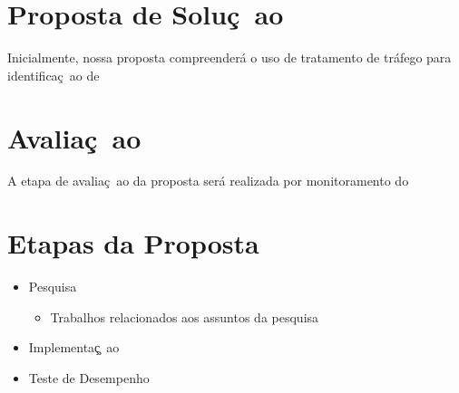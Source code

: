 \documentclass[a4paper, 11pt]{article}
\begin{document}
\section{Proposta de Solu\c{c}~{a}o}
Inicialmente, nossa proposta compreender\'a o uso de tratamento de tr\'afego
para identifica\c{c}~{a}o de 

\section{Avalia\c{c}~{a}o}
A etapa de avalia\c{c}~{a}o da proposta ser\'a realizada por monitoramento do 

\section{Etapas da Proposta}
\begin{itemize}
 \item Pesquisa
  \begin{itemize}
  \item Trabalhos relacionados aos assuntos da pesquisa
  \end{itemize}
 \item Implementa\c\c{c}~{a}o
  \begin{itemize}
  \end{itemize}
 \item Teste de Desempenho 
  \begin{itemize}
  \end{itemize}
\end{itemize}


\newpage


\end{document}
